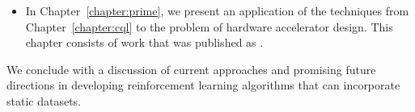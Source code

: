 \documentclass[../thesis.tex]{subfiles}
\begin{document}
\begin{itemize}
    \item In Chapter~\ref{chapter:prime}, we present an application of the techniques from Chapter~\ref{chapter:cql} to the problem of hardware accelerator design. This chapter consists of work that was published as \citet{kumar2021data}.       
\end{itemize} 

We conclude with a discussion of current approaches and promising future directions in developing reinforcement learning algorithms that can incorporate static datasets.





\end{document}
